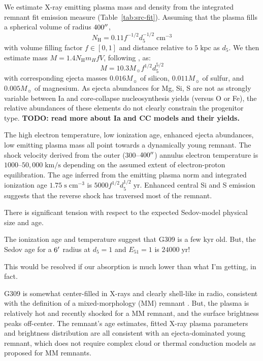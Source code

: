 \documentclass[preprint2,tighten,trackchanges]{aastex6}
\newcommand*{\mt}{\mathrm}
\newcommand*{\unit}[1]{\;\mt{#1}}  %
\newcommand*{\nH}{N_{\mathrm{H}}}
\newcommand*{\TauUnits}{\unit{s\;cm^{-3}}}
\begin{document}
\begin{figure*}[!ht]
    \label{fig:kt-tau-radius}
\end{figure*}

We estimate X-ray emitting plasma mass and density from the integrated remnant
fit emission measure (Table~\ref{tab:src-fit}).
Assuming that the plasma fills a spherical volume of radius $400\mbox{$^{\prime\prime}$}$,
\[
    \nH = 0.11 f^{-1/2} d_{5}^{-1/2} \unit{cm^{-3}}
\]
with volume filling factor $f \in [0,1]$ and distance relative to $5
\unit{kpc}$ as $d_{5}$.
We then estimate mass $M = 1.4 \nH m_{H} f V$, following \citet{auchettl2015},
as:
\[
    M = 10.3 M_{\sun} f^{1/2} d_{5}^{5/2}
\]
with corresponding ejecta masses $0.016 M_{\sun}$ of silicon, $0.011 M_{\sun}$
of sulfur, and $0.005 M_{\sun}$ of magnesium.
As ejecta abundances for Mg, Si, S are not as strongly variable between Ia and
core-collapse nucleosynthesis yields (versus O or Fe), the relative abundances
of these elements do not clearly constrain the progenitor type.
\textbf{TODO: read more about Ia and CC models and their yields.}


The high electron temperature, low ionization age, enhanced ejecta abundances,
low emitting plasma mass all point towards a dynamically young remnant.
The shock velocity derived from the outer ($300$--$400\mbox{$^{\prime\prime}$}$) annulus
electron temperature is $1000$--$50,000 \unit{km/s}$ depending on the assumed
extent of electron-proton equilibration.
The age inferred from the emitting plasma norm and integrated ionization age
$1.75 \TauUnits$ is $5000 f^{1/2} d_{5}^{1/2} \unit{yr}$.
Enhanced central Si and S emission suggests that the reverse shock has
traversed most of the remnant.

There is significant tension with respect to the expected Sedov-model physical
size and age.

The ionization age and temperature suggest that G309 is a few kyr old.
But, the Sedov age for a $6\mbox{$^\prime$}$ radius at $d_{5} = 1$ and $E_{51} = 1$ is
$24000 \unit{yr}$!

This would be resolved if our absorption is much lower than what I'm getting,
in fact.

G309 is somewhat center-filled in X-rays and clearly shell-like in radio,
consistent with the definition of a mixed-morphology (MM) remnant
\citep{rho1998}.
But, the plasma is relatively hot and recently shocked for a MM remnant, and
the surface brightness peaks off-center.
The remnant's age estimates, fitted X-ray plasma parameters and brightness
distribution are all consistent with an ejecta-dominated young remnant, which
does not require complex cloud or thermal conduction models as proposed for MM
remnants.
\end{document}
